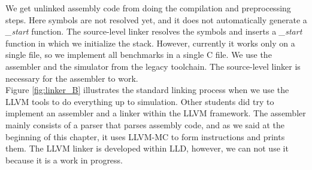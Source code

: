 We get unlinked assembly code from doing the compilation and preprocessing steps. Here symbols are not resolved yet, and it does not automatically generate a \emph{\_start} function. The source-level linker resolves the symbols and inserts a \emph{\_start} function in which we initialize the stack. However, currently it works only on a single file, so we implement all benchmarks in a single C file. We use the assembler and the simulator from the legacy toolchain. The source-level linker is necessary for the assembler to work. \\

Figure \ref{fig:linker_B} illustrates the standard linking process when we use the LLVM tools to do everything up to simulation. Other students did try to implement an assembler and a linker within the LLVM framework. The assembler mainly consists of a parser that parses assembly code, and as we said at the beginning of this chapter, it uses LLVM-MC to form instructions and prints them. The LLVM linker is developed within LLD, however, we can not use it because it is a work in progress.










